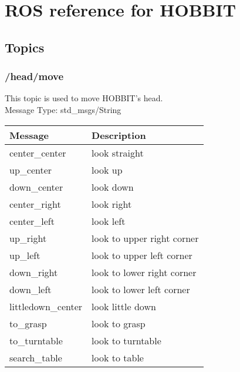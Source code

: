 \documentclass[a4paper,12pt]{article}
\begin{document}
\section*{ROS reference for HOBBIT}
\subsection*{Topics}
\subsubsection*{/head/move}
This topic is used to move HOBBIT's head.\\
Message Type: std\_msgs/String
\begin{table}[h]
    \centering
    \begin{tabular}{|l|l|}
        \hline
        Message & Description \\ \hline
        center\_center & look straight \\ \hline
        up\_center & look up \\ \hline
        down\_center & look down \\ \hline
        center\_right & look right \\ \hline
        center\_left & look left \\ \hline
        up\_right & look to upper right corner \\ \hline
        up\_left & look to upper left corner \\ \hline
        down\_right & look to lower right corner \\ \hline
        down\_left & look to lower left corner \\ \hline
        littledown\_center & look little down \\ \hline
        to\_grasp & look to grasp \\ \hline
        to\_turntable & look to turntable \\ \hline
        search\_table & look to table \\
        \hline
    \end{tabular}
\end{table}
\end{document}
